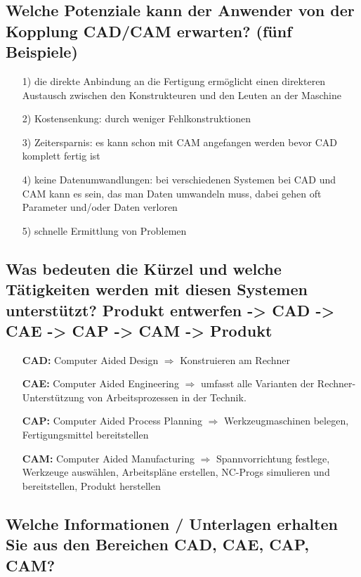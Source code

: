 \subsection*{Welche Potenziale kann der Anwender von der Kopplung CAD/CAM erwarten? 
(fünf Beispiele) }


\begin{itemize}
\item[1)] die direkte Anbindung an die Fertigung ermöglicht einen direkteren Austausch zwischen den Konstrukteuren und den Leuten an der Maschine
\item[2)] Kostensenkung: durch weniger Fehlkonstruktionen
\item[3)] Zeitersparnis: es kann schon mit CAM angefangen werden bevor CAD komplett fertig ist
\item[4)] keine Datenumwandlungen: bei verschiedenen Systemen bei CAD und CAM kann es sein, das man Daten umwandeln muss, dabei gehen oft Parameter und/oder Daten verloren
\item[5)] schnelle Ermittlung von Problemen
\end{itemize}

\newpage

\subsection*{Was bedeuten die Kürzel und welche Tätigkeiten werden mit diesen Systemen 
unterstützt?  
Produkt entwerfen -> CAD -> CAE -> CAP -> CAM -> Produkt }


\begin{itemize}
\item[\textbf{CAD:}] Computer Aided Design $\Rightarrow$ Konstruieren am Rechner
\item[\textbf{CAE:}] Computer Aided Engineering $\Rightarrow$ umfasst alle Varianten der Rechner-Unterstützung von Arbeitsprozessen in der Technik.
\item[\textbf{CAP:}] Computer Aided Process Planning $\Rightarrow$ Werkzeugmaschinen belegen, Fertigungsmittel bereitstellen
\item[\textbf{CAM:}] Computer Aided Manufacturing $\Rightarrow$ Spannvorrichtung festlege, Werkzeuge auswählen, Arbeitspläne erstellen, NC-Progs simulieren und bereitstellen, Produkt herstellen
\end{itemize}


\subsection*{Welche Informationen / Unterlagen erhalten Sie aus den Bereichen CAD, CAE, 
CAP, CAM? }

